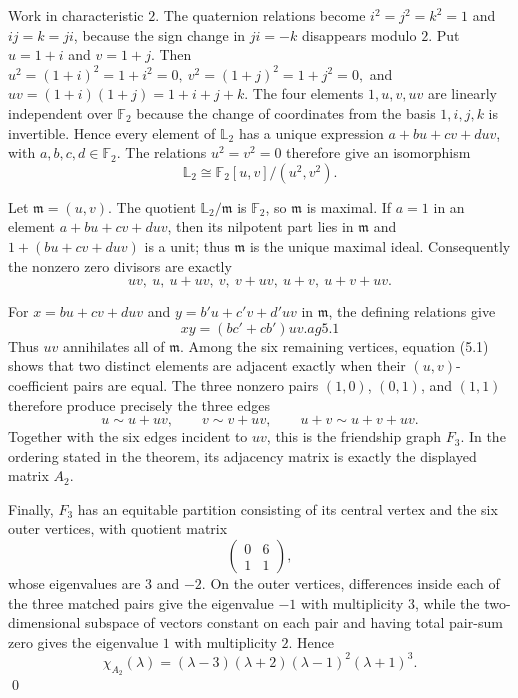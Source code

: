 \documentclass[12pt]{article}
\renewenvironment{proof}{{\bf \noindent Proof.}}{\qed}
\theoremstyle{definition}
\newcommand{\F}{\mathbb{F}}
\newcommand{\LL}{\mathbb{L}}
\begin{document}
	\begin{proof}
		Work in characteristic $2$. The quaternion relations become $i^2=j^2=k^2=1$ and $ij=k=ji$, because the sign change in $ji=-k$ disappears modulo $2$. Put $u=1+i$ and $v=1+j$. Then
		$
		u^2=(1+i)^2=1+i^2=0,~
		v^2=(1+j)^2=1+j^2=0,
		$
		and
		$
		uv=(1+i)(1+j)=1+i+j+k.
		$
		The four elements $1,u,v,uv$ are linearly independent over $\F_2$ because the change of coordinates from the basis $1,i,j,k$ is invertible. Hence every element of $\LL_2$ has a unique expression $a+bu+cv+duv$, with $a,b,c,d\in\F_2$. The relations $u^2=v^2=0$ therefore give an isomorphism
		$$
		\LL_2\cong\F_2[u,v]/(u^2,v^2).
		$$
		
		Let $\mathfrak m=(u,v)$. The quotient $\LL_2/\mathfrak m$ is $\F_2$, so $\mathfrak m$ is maximal. If $a=1$ in an element $a+bu+cv+duv$, then its nilpotent part lies in $\mathfrak m$ and $1+(bu+cv+duv)$ is a unit; thus $\mathfrak m$ is the unique maximal ideal. Consequently the nonzero zero divisors are exactly
		$$
		uv,\ u,\ u+uv,\ v,\ v+uv,\ u+v,\ u+v+uv.
		$$
		
		For $x=bu+cv+duv$ and $y=b'u+c'v+d'uv$ in $\mathfrak m$, the defining relations give
		$$
		xy=(bc'+cb')uv.
		ag{5.1}
		$$
		Thus $uv$ annihilates all of $\mathfrak m$. Among the six remaining vertices, equation (5.1) shows that two distinct elements are adjacent exactly when their $(u,v)$-coefficient pairs are equal. The three nonzero pairs $(1,0)$, $(0,1)$, and $(1,1)$ therefore produce precisely the three edges
		$$
		u\sim u+uv,
		\qquad
		v\sim v+uv,
		\qquad
		u+v\sim u+v+uv.
		$$
		Together with the six edges incident to $uv$, this is the friendship graph $F_3$. In the ordering stated in the theorem, its adjacency matrix is exactly the displayed matrix $A_2$.
		
		Finally, $F_3$ has an equitable partition consisting of its central vertex and the six outer vertices, with quotient matrix
		$$
		\begin{pmatrix}0&6\\1&1\end{pmatrix},
		$$
		whose eigenvalues are $3$ and $-2$. On the outer vertices, differences inside each of the three matched pairs give the eigenvalue $-1$ with multiplicity $3$, while the two-dimensional subspace of vectors constant on each pair and having total pair-sum zero gives the eigenvalue $1$ with multiplicity $2$. Hence
		$$
		\chi_{A_2}(\lambda)=(\lambda-3)(\lambda+2)(\lambda-1)^2(\lambda+1)^3.
		$$
	\end{proof}
	
\end{document}
